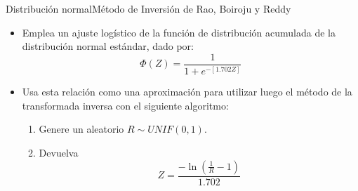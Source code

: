 \begin{frame}{Distribución normal}{Método de Inversión de Rao, Boiroju y Reddy}
    \begin{itemize}
        \item Emplea un ajuste logístico de la función de distribución acumulada de la distribución normal estándar, dado por:
        \begin{equation*}
            \Phi (Z)=\frac{1}{1+e^{-[1.702 Z]}}
        \end{equation*}
        \item Usa esta relación como una aproximación para utilizar luego el método de la transformada inversa con el siguiente algoritmo:
        \begin{enumerate}
            \item Genere un aleatorio $R\sim UNIF(0,1)$.
            \item Devuelva \begin{equation*}
                Z=\frac{-\ln{\left(\frac{1}{R}-1\right)}}{1.702}
            \end{equation*}
        \end{enumerate}
    \end{itemize}    
\end{frame}